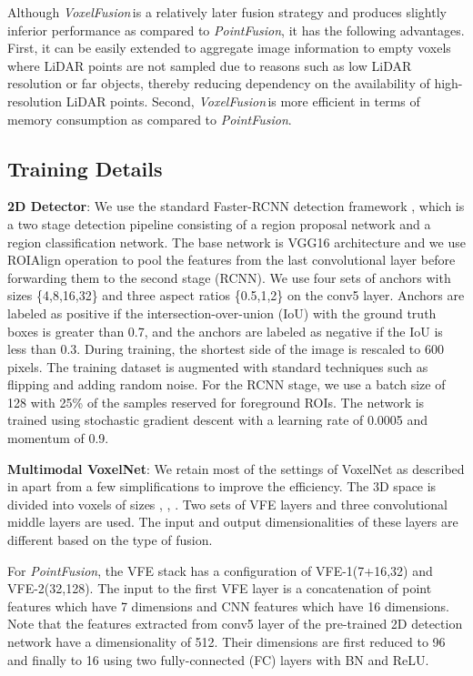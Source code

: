 \documentclass[letterpaper, 10 pt, conference]{ieeeconf}
\newcommand{\PF}{\textit{PointFusion}}
\newcommand{\VF}{\textit{VoxelFusion}}
\begin{document}
Although \VF{\,}is a relatively later fusion strategy and produces slightly inferior performance as compared to \PF, it has the following advantages. First, it can be easily extended to aggregate image information to empty voxels where LiDAR points are not sampled due to reasons such as low LiDAR resolution or far objects, thereby reducing dependency on the availability of high-resolution LiDAR points. Second, \VF{\,}is more efficient in terms of memory consumption as compared to \PF.






\subsection{Training Details}
\label{ssec:training}


\noindent\textbf{2D Detector}: We use the standard Faster-RCNN detection framework \cite{ren2015faster}, which is a two stage detection pipeline consisting of a region proposal network and a region classification network. The base network is VGG16 architecture and we use ROIAlign \cite{he2017mask} operation to pool the features from the last convolutional layer before forwarding them to the second stage (RCNN). We use four sets of anchors with sizes \{4,8,16,32\} and three aspect ratios \{0.5,1,2\} on the conv5 layer. Anchors are labeled as positive if the intersection-over-union (IoU) with the ground truth boxes is greater than 0.7, and the anchors are labeled as negative if the IoU is less than 0.3. During training, the shortest side of the image is rescaled to 600 pixels. The training dataset is augmented with standard techniques such as flipping and adding random noise. For the RCNN stage, we use a batch size of 128 with 25\% of the samples reserved for foreground ROIs. The network is trained using stochastic gradient descent with a learning rate of 0.0005 and momentum of 0.9. 


\noindent\textbf{Multimodal VoxelNet}: We retain most of the settings of VoxelNet as described in \cite{REF:zhou2017voxelnet} apart from a few simplifications to improve the efficiency. 
The 3D space is divided into voxels of sizes , , . Two sets of VFE layers and three convolutional middle layers are used. The input and output dimensionalities of these layers are different based on the type of fusion. 

For \PF, the VFE stack has a configuration of VFE-1(7+16,32) and VFE-2(32,128). The input to the first VFE layer is a concatenation of point features which have 7 dimensions and CNN features which have 16 dimensions. Note that the features extracted from conv5 layer of the pre-trained 2D detection network have a dimensionality of 512. Their dimensions are first reduced to 96 and finally to 16 using two fully-connected (FC) layers with BN and ReLU. 
\end{document}
